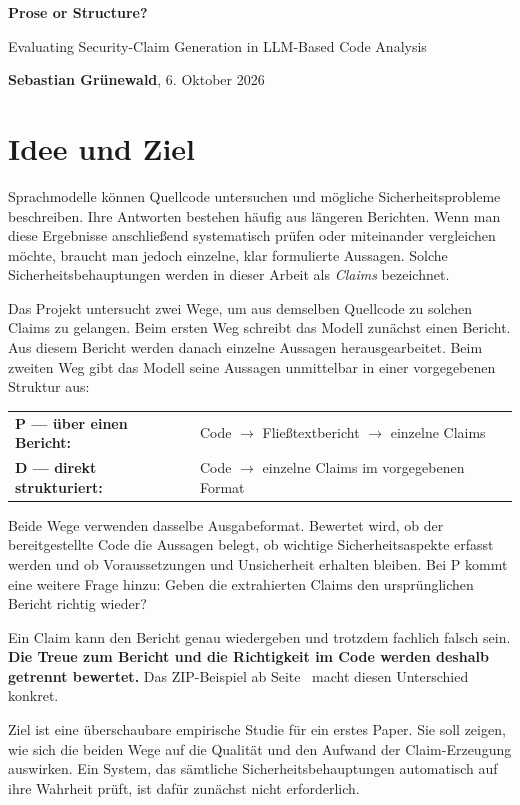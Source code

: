 \documentclass[10pt,a4paper]{article}
\begin{document}
{\fontsize{23}{27}\selectfont\bfseries Prose or Structure?}\par
{\large Evaluating Security-Claim Generation in LLM-Based Code Analysis}\par
\textbf{Sebastian Grünewald}, 6. Oktober 2026

\section{Idee und Ziel}
Sprachmodelle können Quellcode untersuchen und mögliche Sicherheitsprobleme beschreiben. Ihre Antworten bestehen häufig aus längeren Berichten. Wenn man diese Ergebnisse anschlie\ss{}end systematisch prüfen oder miteinander vergleichen möchte, braucht man jedoch einzelne, klar formulierte Aussagen. Solche Sicherheitsbehauptungen werden in dieser Arbeit als \textit{Claims} bezeichnet.

Das Projekt untersucht zwei Wege, um aus demselben Quellcode zu solchen Claims zu gelangen. Beim ersten Weg schreibt das Modell zunächst einen Bericht. Aus diesem Bericht werden danach einzelne Aussagen herausgearbeitet. Beim zweiten Weg gibt das Modell seine Aussagen unmittelbar in einer vorgegebenen Struktur aus:

\begin{center}
\begin{tabular}{@{}ll@{}}
\textbf{P --- über einen Bericht:} & Code $\rightarrow$ Flie\ss{}textbericht $\rightarrow$ einzelne Claims \\
\textbf{D --- direkt strukturiert:} & Code $\rightarrow$ einzelne Claims im vorgegebenen Format
\end{tabular}
\end{center}

Beide Wege verwenden dasselbe Ausgabeformat. Bewertet wird, ob der bereitgestellte Code die Aussagen belegt, ob wichtige Sicherheitsaspekte erfasst werden und ob Voraussetzungen und Unsicherheit erhalten bleiben. Bei P kommt eine weitere Frage hinzu: Geben die extrahierten Claims den ursprünglichen Bericht richtig wieder?

Ein Claim kann den Bericht genau wiedergeben und trotzdem fachlich falsch sein. \textbf{Die Treue zum Bericht und die Richtigkeit im Code werden deshalb getrennt bewertet.} Das ZIP-Beispiel ab Seite~\pageref{sec:zip-example} macht diesen Unterschied konkret.

Ziel ist eine überschaubare empirische Studie für ein erstes Paper. Sie soll zeigen, wie sich die beiden Wege auf die Qualität und den Aufwand der Claim-Erzeugung auswirken. Ein System, das sämtliche Sicherheitsbehauptungen automatisch auf ihre Wahrheit prüft, ist dafür zunächst nicht erforderlich.
\end{document}
